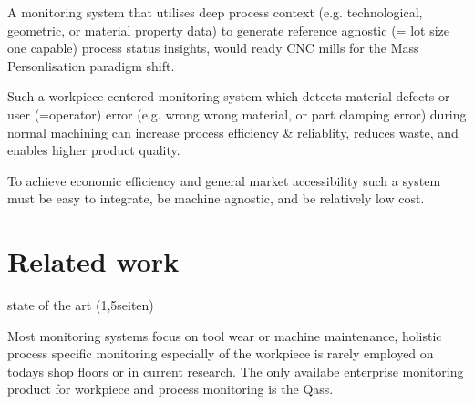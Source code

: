 \documentclass[5p,times,procedia]{elsarticle}
\newenvironment{note}{%
	\noindent
    \color{notecolor}%
}{%
    \par\medskip%
}
\begin{document}
\begin{nomenclature}
\begin{deflist}[AAA]%
\end{deflist}
\end{nomenclature}%


A monitoring system that utilises deep process context (e.g. technological, geometric, or material property data) to generate reference agnostic (= lot size one capable) process status insights, would ready CNC mills for the Mass Personlisation paradigm shift.

Such a workpiece centered monitoring system which detects material defects or user (=operator) error (e.g. wrong wrong material, or part clamping error) during normal machining can increase process efficiency \& reliablity, reduces waste, and enables higher product quality.  

To achieve economic efficiency and general market accessibility such a system must be easy to integrate, be machine agnostic, and be relatively low cost.

 
\section{Related work}
\begin{note}
	state of the art (1,5seiten)

\end{note}


Most monitoring systems focus on tool wear or machine maintenance, holistic process specific monitoring especially of the workpiece is rarely employed on todays shop floors or in current research. The only availabe enterprise monitoring product for workpiece and process monitoring is the Qass. 
\end{document}

